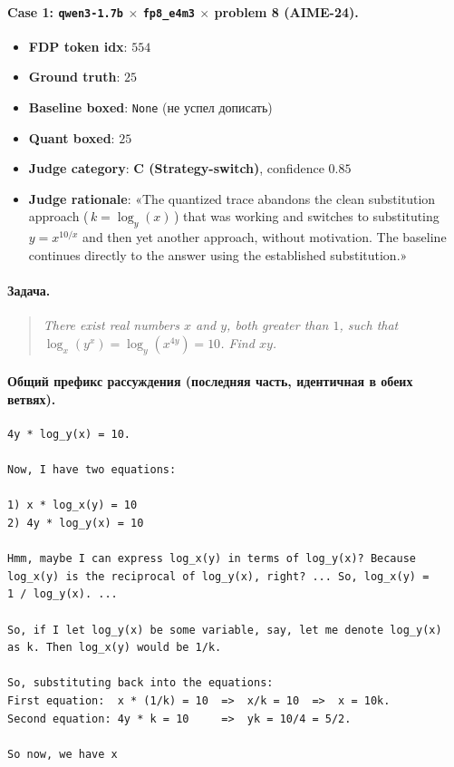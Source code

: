 \documentclass[11pt, a4paper]{article}
\newcommand{\code}[1]{\texttt{#1}}
\begin{document}
\paragraph{Case 1: \code{qwen3-1.7b} $\times$ \code{fp8\_e4m3} $\times$ problem 8 (AIME-24).}
\begin{itemize}[leftmargin=*, itemsep=0pt]
\item \textbf{FDP token idx}: $554$
\item \textbf{Ground truth}: $25$
\item \textbf{Baseline boxed}: \code{None} (не успел дописать)
\item \textbf{Quant boxed}: $25$
\item \textbf{Judge category}: \textbf{C (Strategy-switch)}, confidence $0.85$
\item \textbf{Judge rationale}: «The quantized trace abandons the clean
substitution approach (\,$k = \log_{y}(x)$\,) that was working and switches to
substituting $y = x^{10/x}$ and then yet another approach, without
motivation. The baseline continues directly to the answer using the
established substitution.»
\end{itemize}

\paragraph{Задача.}
\begin{quote}
\itshape
There exist real numbers $x$ and $y$, both greater than $1$, such that
$\log_{x}(y^{x}) = \log_{y}(x^{4y}) = 10$. Find $xy$.
\end{quote}

\paragraph{Общий префикс рассуждения (последняя часть, идентичная в обеих ветвях).}
\begin{lstlisting}
4y * log_y(x) = 10.

Now, I have two equations:

1) x * log_x(y) = 10
2) 4y * log_y(x) = 10

Hmm, maybe I can express log_x(y) in terms of log_y(x)? Because
log_x(y) is the reciprocal of log_y(x), right? ... So, log_x(y) =
1 / log_y(x). ...

So, if I let log_y(x) be some variable, say, let me denote log_y(x)
as k. Then log_x(y) would be 1/k.

So, substituting back into the equations:
First equation:  x * (1/k) = 10  =>  x/k = 10  =>  x = 10k.
Second equation: 4y * k = 10     =>  yk = 10/4 = 5/2.

So now, we have x
\end{lstlisting}
\end{document}
